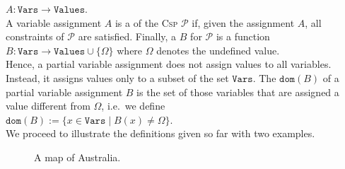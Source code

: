 $A: \mathtt{Vars} \rightarrow \mathtt{Values}$.
\\[0.2cm]
A variable assignment $A$ is a  of the \textsc{Csp} $\mathcal{P}$ 
if, given the assignment $A$, all constraints of $\mathcal{P}$ are satisfied.
Finally, a  $B$ for $\mathcal{P}$ is a function
\\[0.2cm]
\hspace*{1.3cm}
$B: \mathtt{Vars} \rightarrow \mathtt{Values} \cup \{ \Omega \}$ \quad where $\Omega$ denotes the undefined value.
\\[0.2cm]
Hence, a partial variable assignment does not assign values to all variables.  Instead, it assigns values only
to a subset of the set $\mathtt{Vars}$.  The  $\mathtt{dom}(B)$ of a partial variable assignment $B$ is the
set of those variables that are assigned a value different from $\Omega$, i.e.~we define
\\[0.2cm]
\hspace*{1.3cm}
$\mathtt{dom}(B) := \bigl\{ x \in \mathtt{Vars} \mid B(x) \not= \Omega \bigr\}$.
\\[0.2cm]
We proceed to illustrate the definitions given so far with two examples.


\begin{figure}[!ht]
  \centering
  \caption{A map of Australia.}
  \label{fig:australia.pdf}
\end{figure}

